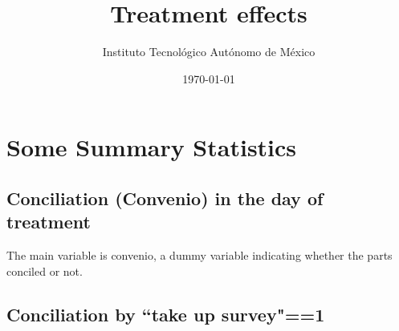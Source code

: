 \documentclass[12pt]{article}
\theoremstyle{named}
\newcommand{\folder}{C:/Users/chasi_000/Dropbox/Statistics/P10/Results/Results_2/Effect}
\begin{document}
\title{Treatment effects}

\author{Instituto Tecnológico Autónomo de México}
\date{\today}
\maketitle


\hrulefill


\section{\Huge{Some Summary Statistics}}

\vspace{7mm}


\subsection*{Conciliation (Convenio) in the day of treatment}

The main variable is convenio, a dummy variable indicating whether the parts conciled or not.\\

\begin{center}
\scriptsize{}
\end{center}

\begin{center}
\scriptsize{}
\end{center}

\begin{center}
\scriptsize{}
\end{center}

\begin{center}
\scriptsize{}
\end{center}

\vspace{5mm}


\pagebreak


\subsection*{Conciliation by ``take up survey"==1}


\scriptsize{}

\scriptsize{}

\scriptsize{}
\end{document}
